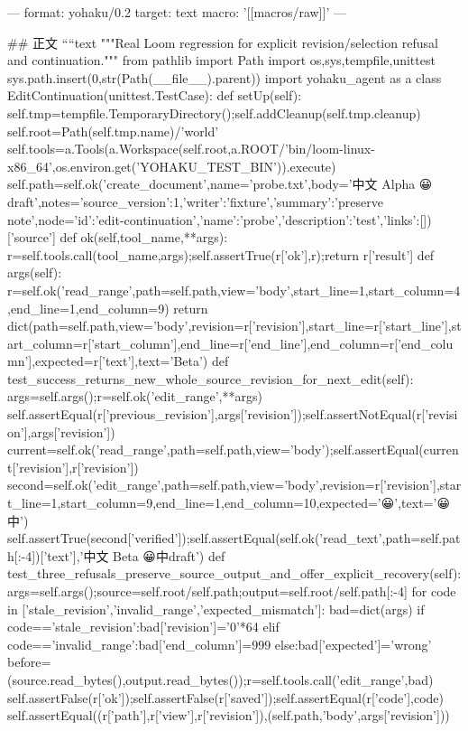 ---
format: yohaku/0.2
target: text
macro: '[[macros/raw]]'
---

## 正文
````text
"""Real Loom regression for explicit revision/selection refusal and continuation."""
from pathlib import Path
import os,sys,tempfile,unittest
sys.path.insert(0,str(Path(__file__).parent))
import yohaku_agent as a
class EditContinuation(unittest.TestCase):
 def setUp(self):
  self.tmp=tempfile.TemporaryDirectory();self.addCleanup(self.tmp.cleanup)
  self.root=Path(self.tmp.name)/'world'
  self.tools=a.Tools(a.Workspace(self.root,a.ROOT/'bin/loom-linux-x86_64',os.environ.get('YOHAKU_TEST_BIN')).execute)
  self.path=self.ok('create_document',name='probe.txt',body='中文 Alpha 😀\nEnglish draft\n',notes={'source_version':1,'writer':'fixture','summary':'preserve note'},node={'id':'edit-continuation','name':'probe','description':'test','links':[]})['source']
 def ok(self,tool_name,**args):
  r=self.tools.call(tool_name,args);self.assertTrue(r['ok'],r);return r['result']
 def args(self):
  r=self.ok('read_range',path=self.path,view='body',start_line=1,start_column=4,end_line=1,end_column=9)
  return dict(path=self.path,view='body',revision=r['revision'],start_line=r['start_line'],start_column=r['start_column'],end_line=r['end_line'],end_column=r['end_column'],expected=r['text'],text='Beta')
 def test_success_returns_new_whole_source_revision_for_next_edit(self):
  args=self.args();r=self.ok('edit_range',**args)
  self.assertEqual(r['previous_revision'],args['revision']);self.assertNotEqual(r['revision'],args['revision'])
  current=self.ok('read_range',path=self.path,view='body');self.assertEqual(current['revision'],r['revision'])
  second=self.ok('edit_range',path=self.path,view='body',revision=r['revision'],start_line=1,start_column=9,end_line=1,end_column=10,expected='😀',text='😀中')
  self.assertTrue(second['verified']);self.assertEqual(self.ok('read_text',path=self.path[:-4])['text'],'中文 Beta 😀中\nEnglish draft\n')
 def test_three_refusals_preserve_source_output_and_offer_explicit_recovery(self):
  args=self.args();source=self.root/self.path;output=self.root/self.path[:-4]
  for code in ['stale_revision','invalid_range','expected_mismatch']:
   bad=dict(args)
   if code=='stale_revision':bad['revision']='0'*64
   elif code=='invalid_range':bad['end_column']=999
   else:bad['expected']='wrong'
   before=(source.read_bytes(),output.read_bytes());r=self.tools.call('edit_range',bad)
   self.assertFalse(r['ok']);self.assertFalse(r['saved']);self.assertEqual(r['code'],code)
   self.assertEqual((r['path'],r['view'],r['revision']),(self.path,'body',args['revision']))
